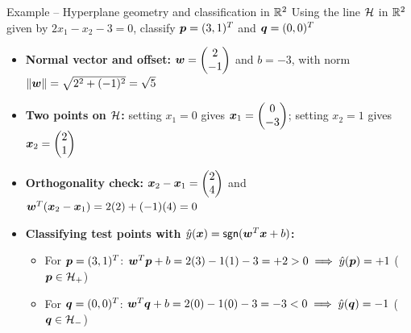\documentclass[aspectratio=169]{beamer}\usepackage[]{graphicx}\usepackage[]{xcolor}
\begin{document}
\begin{frame}{Example -- Hyperplane geometry and classification in $\mathbb{R}^2$}
    Using the line $\mathcal{H}$ in $\mathbb{R}^2$ given by $2x_1 - x_2 - 3 = 0$, classify $\bm{p} = (3, 1)^T$ and $\bm{q} = (0, 0)^T$
    \vfill
    \begin{itemize}
        \item \textbf{Normal vector and offset:} $\bm{w} = \begin{pmatrix} 2 \\ -1 \end{pmatrix}$ and $b = -3$, with norm $\|\bm{w}\| = \sqrt{2^2 + (-1)^2} = \sqrt{5}$
        \vfill
        \item \textbf{Two points on $\mathcal{H}$:} setting $x_1 = 0$ gives $\bm{x}_1 = \begin{pmatrix} 0 \\ -3 \end{pmatrix}$; setting $x_2 = 1$ gives $\bm{x}_2 = \begin{pmatrix} 2 \\ 1 \end{pmatrix}$
        \vfill
        \item \textbf{Orthogonality check:} $\bm{x}_2 - \bm{x}_1 = \begin{pmatrix} 2 \\ 4 \end{pmatrix}$ and $\bm{w}^T(\bm{x}_2 - \bm{x}_1) = 2(2) + (-1)(4) = 0$
        \vfill
        \item \textbf{Classifying test points with $\hat{y}(\bm{x}) = \mathsf{sgn}(\bm{w}^T \bm{x} + b)$:}
        \begin{itemize}
            \item For $\bm{p} = (3, 1)^T$: $\bm{w}^T \bm{p} + b = 2(3) - 1(1) - 3 = +2 > 0 \implies \hat{y}(\bm{p}) = +1$ ($\bm{p} \in \mathcal{H}_+$)
            \item For $\bm{q} = (0, 0)^T$: $\bm{w}^T \bm{q} + b = 2(0) - 1(0) - 3 = -3 < 0 \implies \hat{y}(\bm{q}) = -1$ ($\bm{q} \in \mathcal{H}_-$)
        \end{itemize}
    \end{itemize}
\end{frame}


\end{document}
